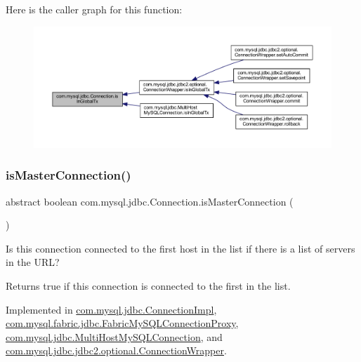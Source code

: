 Here is the caller graph for this function\+:\nopagebreak
\begin{figure}[H]
\begin{center}
\leavevmode
\includegraphics[width=350pt]{interfacecom_1_1mysql_1_1jdbc_1_1_connection_a78a9a11946443467d3fbc7838922a205_icgraph}
\end{center}
\end{figure}
\mbox{\label{interfacecom_1_1mysql_1_1jdbc_1_1_connection_a39d6c162da8f21b7c2a3299f91e7c65a}} 
\subsubsection{\texorpdfstring{is\+Master\+Connection()}{isMasterConnection()}}
{\footnotesize\ttfamily abstract boolean com.\+mysql.\+jdbc.\+Connection.\+is\+Master\+Connection (\begin{DoxyParamCaption}{ }\end{DoxyParamCaption})\hspace{0.3cm}{\ttfamily [abstract]}}

Is this connection connected to the first host in the list if there is a list of servers in the U\+RL?

\begin{DoxyReturn}{Returns}
true if this connection is connected to the first in the list. 
\end{DoxyReturn}


Implemented in \mbox{\hyperlink{classcom_1_1mysql_1_1jdbc_1_1_connection_impl_aac202776da9d2d04275ff2bde2c253b4}{com.\+mysql.\+jdbc.\+Connection\+Impl}}, \mbox{\hyperlink{classcom_1_1mysql_1_1fabric_1_1jdbc_1_1_fabric_my_s_q_l_connection_proxy_a5843b7680b8991eadcfc2b5c38e88c28}{com.\+mysql.\+fabric.\+jdbc.\+Fabric\+My\+S\+Q\+L\+Connection\+Proxy}}, \mbox{\hyperlink{classcom_1_1mysql_1_1jdbc_1_1_multi_host_my_s_q_l_connection_a63f3a1689c557f644de8accf62405885}{com.\+mysql.\+jdbc.\+Multi\+Host\+My\+S\+Q\+L\+Connection}}, and \mbox{\hyperlink{classcom_1_1mysql_1_1jdbc_1_1jdbc2_1_1optional_1_1_connection_wrapper_a4259500598efa1b3dc8cf4317792338b}{com.\+mysql.\+jdbc.\+jdbc2.\+optional.\+Connection\+Wrapper}}.

